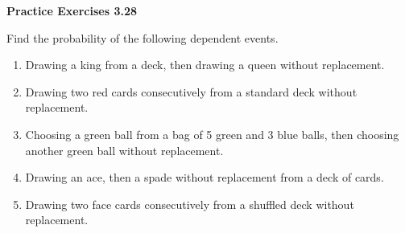 \vspace{0.3ex}
\noindent\textbf{Practice Exercises 3.28}

\vspace{0.2ex}

Find the probability of the following dependent events.

\begin{enumerate}[label=\color{blue}\arabic*.]
    \item Drawing a king from a deck, then drawing a queen without replacement.
    \item Drawing two red cards consecutively from a standard deck without replacement.
    \item Choosing a green ball from a bag of 5 green and 3 blue balls, then choosing another green ball without replacement.
    \item Drawing an ace, then a spade without replacement from a deck of cards.
    \item Drawing two face cards consecutively from a shuffled deck without replacement.
\end{enumerate}
